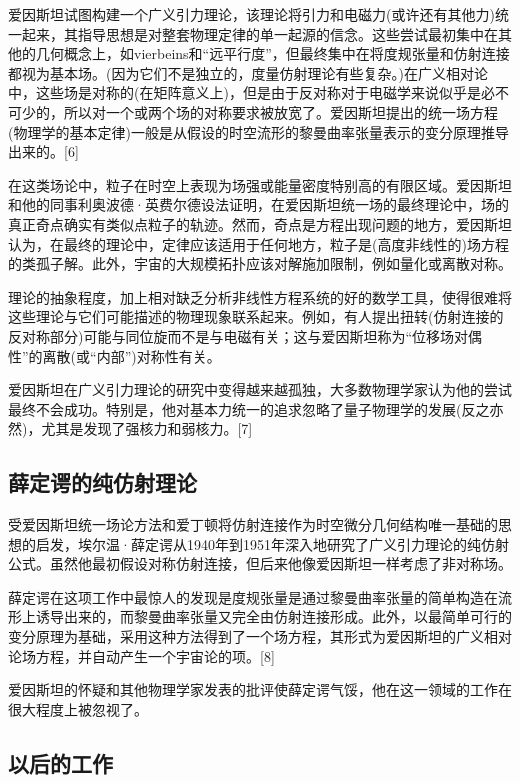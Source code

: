 爱因斯坦试图构建一个广义引力理论，该理论将引力和电磁力(或许还有其他力)统一起来，其指导思想是对整套物理定律的单一起源的信念。这些尝试最初集中在其他的几何概念上，如vierbeins和“远平行度”，但最终集中在将度规张量和仿射连接都视为基本场。(因为它们不是独立的，度量仿射理论有些复杂。)在广义相对论中，这些场是对称的(在矩阵意义上)，但是由于反对称对于电磁学来说似乎是必不可少的，所以对一个或两个场的对称要求被放宽了。爱因斯坦提出的统一场方程(物理学的基本定律)一般是从假设的时空流形的黎曼曲率张量表示的变分原理推导出来的。[6]

在这类场论中，粒子在时空上表现为场强或能量密度特别高的有限区域。爱因斯坦和他的同事利奥波德·英费尔德设法证明，在爱因斯坦统一场的最终理论中，场的真正奇点确实有类似点粒子的轨迹。然而，奇点是方程出现问题的地方，爱因斯坦认为，在最终的理论中，定律应该适用于任何地方，粒子是(高度非线性的)场方程的类孤子解。此外，宇宙的大规模拓扑应该对解施加限制，例如量化或离散对称。

理论的抽象程度，加上相对缺乏分析非线性方程系统的好的数学工具，使得很难将这些理论与它们可能描述的物理现象联系起来。例如，有人提出扭转(仿射连接的反对称部分)可能与同位旋而不是与电磁有关；这与爱因斯坦称为“位移场对偶性”的离散(或“内部”)对称性有关。

爱因斯坦在广义引力理论的研究中变得越来越孤独，大多数物理学家认为他的尝试最终不会成功。特别是，他对基本力统一的追求忽略了量子物理学的发展(反之亦然)，尤其是发现了强核力和弱核力。[7]

\subsection{薛定谔的纯仿射理论}

受爱因斯坦统一场论方法和爱丁顿将仿射连接作为时空微分几何结构唯一基础的思想的启发，埃尔温·薛定谔从1940年到1951年深入地研究了广义引力理论的纯仿射公式。虽然他最初假设对称仿射连接，但后来他像爱因斯坦一样考虑了非对称场。

薛定谔在这项工作中最惊人的发现是度规张量是通过黎曼曲率张量的简单构造在流形上诱导出来的，而黎曼曲率张量又完全由仿射连接形成。此外，以最简单可行的变分原理为基础，采用这种方法得到了一个场方程，其形式为爱因斯坦的广义相对论场方程，并自动产生一个宇宙论的项。[8]

爱因斯坦的怀疑和其他物理学家发表的批评使薛定谔气馁，他在这一领域的工作在很大程度上被忽视了。

\subsection{以后的工作}

